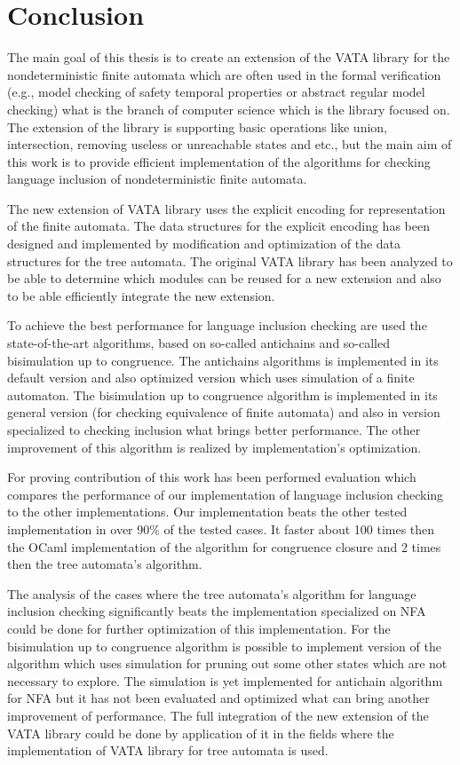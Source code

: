 \chapter{Conclusion}
\label{concl}
The main goal of this thesis is to create an extension of the VATA library for the nondeterministic finite automata 
which are often used in the formal verification (e.g., model checking of safety temporal properties or 
abstract regular model checking) what is the branch of computer science which is the library focused on. The extension of the library is supporting
basic operations like union, intersection, removing useless or unreachable states and etc., but the main aim of this work is to provide
efficient implementation of the algorithms for checking language inclusion of nondeterministic finite automata.

The new extension of VATA library uses the explicit encoding for representation of the finite automata. 
The data structures for the explicit encoding has been designed
and implemented by modification and optimization of the data structures for the tree automata. The original VATA library has been analyzed to be able to determine
which modules can be reused for a new extension and also to be able efficiently integrate the new extension.

To achieve the best performance for language inclusion checking are used the state-of-the-art algorithms, based on so-called antichains and so-called bisimulation
up to congruence. The antichains algorithms is implemented in its default version and also optimized version which uses simulation of a finite automaton. 
The bisimulation up to congruence algorithm is implemented in its general version (for checking equivalence of finite automata) and also in
version specialized to checking inclusion what brings better performance. The other improvement of this algorithm is realized by implementation's optimization.

For proving contribution of this work has been performed evaluation which compares the performance of our implementation of language
inclusion checking to the other implementations. 
Our implementation beats the other tested implementation in over 90\% of the tested cases. It faster about 100 times then the OCaml implementation of the
algorithm for congruence closure and 2 times then the tree automata's algorithm.

The analysis of the cases where the tree automata's algorithm for language inclusion checking significantly 
beats the implementation specialized on NFA could be done for further optimization of this implementation. 
For the bisimulation up to congruence algorithm is possible to implement version of the algorithm 
which uses simulation for pruning out some other states which are not necessary to explore. The simulation is yet implemented for antichain algorithm for NFA but
it has not been evaluated and optimized what can bring another improvement of performance. The full integration of the new extension of the
VATA library could be done by application of it in the fields where the implementation of VATA library for tree automata is used.
